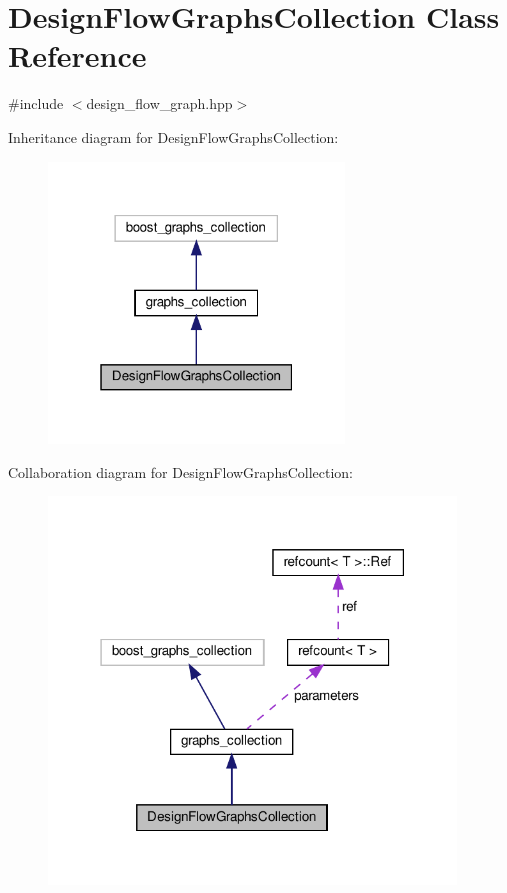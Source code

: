 \hypertarget{classDesignFlowGraphsCollection}{}\section{Design\+Flow\+Graphs\+Collection Class Reference}
\label{classDesignFlowGraphsCollection}


{\ttfamily \#include $<$design\+\_\+flow\+\_\+graph.\+hpp$>$}



Inheritance diagram for Design\+Flow\+Graphs\+Collection\+:
\nopagebreak
\begin{figure}[H]
\begin{center}
\leavevmode
\includegraphics[width=223pt]{df/dbe/classDesignFlowGraphsCollection__inherit__graph}
\end{center}
\end{figure}


Collaboration diagram for Design\+Flow\+Graphs\+Collection\+:
\nopagebreak
\begin{figure}[H]
\begin{center}
\leavevmode
\includegraphics[width=307pt]{dd/de2/classDesignFlowGraphsCollection__coll__graph}
\end{center}
\end{figure}
